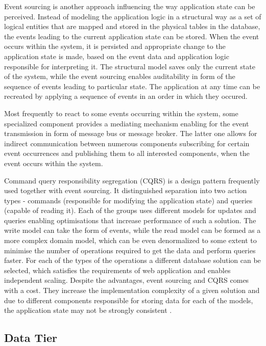 Event sourcing is another approach influencing the way application state can be perceived. Instead of modeling the application logic in a structural way as a set of logical entities that are mapped and stored in the physical tables in the database, the events leading to the current application state can be stored. When the event occurs within the system, it is persisted and appropriate change to the application state is made, based on the event data and application logic responsible for interpreting it. The structural model saves only the current state of the system, while the event sourcing enables auditability in form of the sequence of events leading to particular state. The application at any time can be recreated by applying a sequence of events in an order in which they occured.

Most frequently to react to some events occurring within the system, some specialized component provides a mediating mechanism enabling for the event transmission in form of message bus or message broker. The latter one allows for indirect communication between numerous components subscribing for certain event occurrences and publishing them to all interested components, when the event occurs within the system.

Command query responsibility segregation (CQRS) is a design pattern frequently used together with event sourcing. It distinguished separation into two action types - commands (responsible for modifying the application state) and queries (capable of reading it). Each of the groups uses different models for updates and queries enabling optimisations that increase performance of such a solution. The write model can take the form of events, while the read model can be formed as a more complex domain model, which can be even denormalized to some extent to minimise the number of operations required to get the data and perform queries faster. For each of the types of the operations a different database solution can be selected, which satisfies the requirements of web application and enables independent scaling. Despite the advantages, event sourcing and CQRS comes with a cost. 
They increase the implementation complexity of a given solution and due to different components responsible for storing data for each of the models, the application state may not be strongly consistent \cite{MicroservicesArchitecture}.

\subsection{Data Tier}

